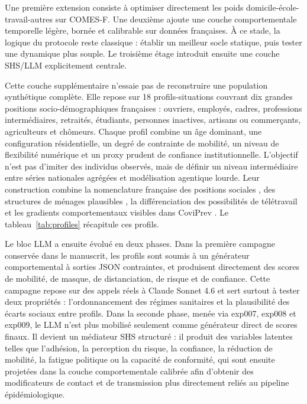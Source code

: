 \documentclass[ROIA,Unicode]{cedram}
\begin{document}
Une première extension consiste à optimiser directement les poids domicile-école-travail-autres sur COMES-F. Une deuxième ajoute une couche comportementale temporelle légère, bornée et calibrable sur données françaises. À ce stade, la logique du protocole reste classique : établir un meilleur socle statique, puis tester une dynamique plus souple. Le troisième étage introduit ensuite une couche SHS/LLM explicitement centrale.

Cette couche supplémentaire n'essaie pas de reconstruire une population synthétique complète. Elle repose sur 18 profils-situations couvrant dix grandes positions socio-démographiques françaises : ouvriers, employés, cadres, professions intermédiaires, retraités, étudiants, personnes inactives, artisans ou commerçants, agriculteurs et chômeurs. Chaque profil combine un âge dominant, une configuration résidentielle, un degré de contrainte de mobilité, un niveau de flexibilité numérique et un proxy prudent de confiance institutionnelle. L'objectif n'est pas d'imiter des individus observés, mais de définir un niveau intermédiaire entre séries nationales agrégées et modélisation agentique lourde. Leur construction combine la nomenclature française des positions sociales \citep{insee2016pcs}, des structures de ménages plausibles \citep{insee2021menages}, la différenciation des possibilités de télétravail \citep{dares2024teletravail} et les gradients comportementaux visibles dans CoviPrev \citep{coviprev2021}. Le tableau~\ref{tab:profiles} récapitule ces profils.

Le bloc LLM a ensuite évolué en deux phases. Dans la première campagne conservée dans le manuscrit, les profils sont soumis à un générateur comportemental à sorties JSON contraintes, et produisent directement des scores de mobilité, de masque, de distanciation, de risque et de confiance. Cette campagne repose sur des appels réels à Claude Sonnet 4.6 et sert surtout à tester deux propriétés : l'ordonnancement des régimes sanitaires et la plausibilité des écarts sociaux entre profils. Dans la seconde phase, menée via exp007, exp008 et exp009, le LLM n'est plus mobilisé seulement comme générateur direct de scores finaux. Il devient un médiateur SHS structuré : il produit des variables latentes telles que l'adhésion, la perception du risque, la confiance, la réduction de mobilité, la fatigue politique ou la capacité de conformité, qui sont ensuite projetées dans la couche comportementale calibrée afin d'obtenir des modificateurs de contact et de transmission plus directement reliés au pipeline épidémiologique.
\end{document}
